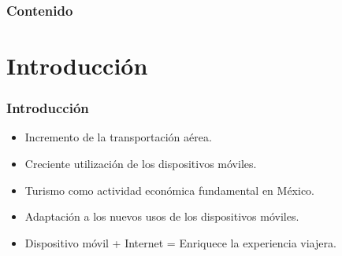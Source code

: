 \documentclass[12pt]{beamer}
\begin{document}
\begin{frame}
\frametitle{Contenido}
\tableofcontents
\end{frame}

\section{Introducción}

\begin{frame}
	\frametitle{Introducción}
	\begin{block}{}
		\begin{itemize}
		\item Incremento de la transportación aérea.
		\item Creciente utilización de los dispositivos móviles.
		\item Turismo como actividad económica fundamental en México.
		\item Adaptación a los nuevos usos de los dispositivos móviles.
		\item Dispositivo móvil + Internet = Enriquece la experiencia viajera.
	\end{itemize}
	\end{block}

\end{frame}
\end{document}
